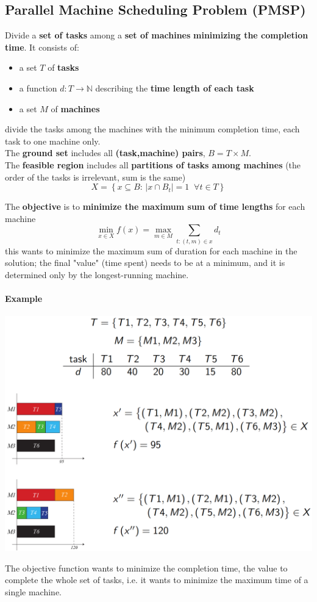\subsection{Parallel Machine Scheduling Problem (PMSP)}
Divide a \textbf{set of tasks} among a \textbf{set of machines} \textbf{minimizing the completion time}. It consists of: 
\begin{itemize}
	\item a set $T$ of \textbf{tasks}
	\item a function $d : T \rightarrow \mathbb{N}$ describing the \textbf{time length of each task}
	\item a set $M$ of \textbf{machines}
\end{itemize}
divide the tasks among the machines with the minimum completion time, each task to one machine only.\\

The \textbf{ground set} includes all \textbf{(task,machine) pairs}, $B = T \times M$.\\

The \textbf{feasible region} includes all \textbf{partitions of tasks among machines} (the order of the tasks is irrelevant, sum is the same)
$$ X = \left\{x \subseteq B : \, |x \cap B_t| = 1 \;\; \forall t \in T \right\}$$

The \textbf{objective} is to \textbf{minimize the maximum sum of time lengths} for each machine
$$ \min_{x \in X} f(x) = \max_{m \in M} \sum_{t:(t,m) \in x} d_t $$
this wants to minimize the maximum sum of duration for each machine in the solution; the final "value" (time spent) needs to be at a minimum, and it is determined only by the longest-running machine.

\newpage

\paragraph{Example}
\begin{center}
	\includegraphics[width=\columnwidth]{img/PMSP}
\end{center}
The objective function wants to minimize the completion time, the value to complete the whole set of tasks, i.e. it wants to minimize the maximum time of a single machine.

